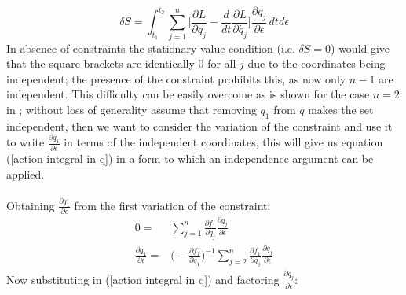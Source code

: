 \documentclass{article}
\begin{document}
\begin{equation}\label{action integral in  q}
    \delta S=\int_{t_1}^{t_2} \sum_{j=1}^{n} \bigg[\frac{\partial L}{\partial {q_j}} -\frac{d}{dt}\frac{\partial L}{\partial \dot{q_j}}\bigg]\frac{\partial q_j}{\partial \epsilon}  \,dtd\epsilon 
\end{equation}
\justify
In absence of constraints the stationary value condition (i.e. $\delta S=0$) would give that the square brackets are identically 0 for all $j$ due to the coordinates being independent; the presence of the constraint prohibits this, as now only $n-1$ are independent. This difficulty can be easily overcome as is shown for the case $n=2$ in \cite{marion2013classical}; without loss of generality assume that removing $q_1$ from $q$ makes the set independent, then we want to consider the variation of the constraint and use it to write $\frac{\partial q_1}{\partial \epsilon}$ in terms of the independent coordinates, this will give us equation (\ref{action integral in  q}) in a form to which an independence argument can be applied.
\\\\
Obtaining $\frac{\partial q_1}{\partial \epsilon}$ from the first variation of the constraint:
\begin{equation*}
\begin{split}
    0=& \sum_{j=1}^{n} \frac{\partial f_1}{\partial q_j} \frac{\partial q_j}{\partial\epsilon}\\
    \frac{\partial q_1}{\partial \epsilon} =& \bigg(-\frac{\partial f_1}{\partial q_1}  \bigg)^{-1}  \sum_{j=2}^{n} \frac{\partial f_1}{\partial q_j} \frac{\partial q_j}{\partial\epsilon}
\end{split}
\end{equation*}
Now substituting in (\ref{action integral in  q}) and factoring $\frac{\partial q_j}{\partial\epsilon}$:
\end{document}
